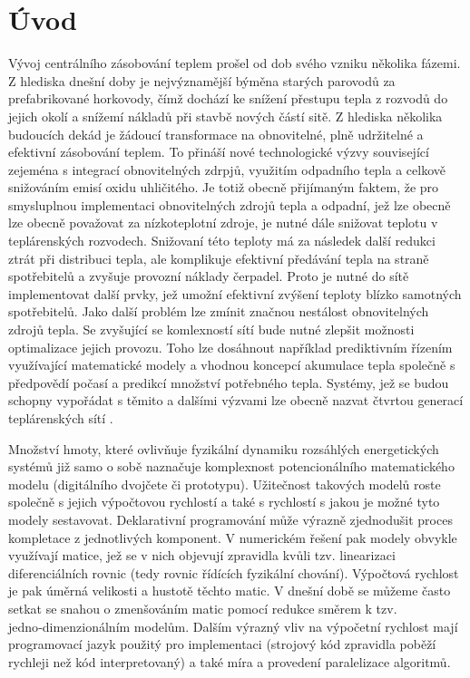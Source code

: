 \chapter{Úvod}
Vývoj centrálního zásobování teplem prošel od dob svého vzniku několika fázemi.
Z hlediska dnešní doby je nejvýznamější býměna starých parovodů za
prefabrikované horkovody, čímž dochází ke snížení přestupu tepla z rozvodů do
jejich okolí a snížemí nákladů při stavbě nových částí sitě. Z hlediska
několika budoucích dekád je žádoucí transformace na obnovitelné, plně
udržitelné a efektivní zásobování teplem. To přináší nové technologické výzvy
související zejeména s integrací obnovitelných zdrpjů, využitím odpadního tepla
a celkově snižováním emisí oxidu uhličitého. Je totiž obecně přijímaným faktem,
že pro smysluplnou implementaci obnovitelných zdrojů tepla a odpadní, jež lze
obecně lze obecně považovat za nízkoteplotní zdroje, je nutné dále snižovat
teplotu v teplárenských rozvodech. Snižovaní této teploty má za následek další
redukci ztrát při distribuci tepla, ale komplikuje efektivní předávání tepla na
straně spotřebitelů a zvyšuje provozní náklady čerpadel. Proto je nutné do sítě
implementovat další prvky, jež umožní efektivní zvýšení teploty blízko
samotných spotřebitelů. Jako další problém lze zmínit značnou nestálost
obnovitelných zdrojů tepla. Se zvyšující se komlexností sítí bude nutné zlepšit
možnosti optimalizace jejich provozu. Toho lze dosáhnout například prediktivním
řízením využívající matematické modely a vhodnou koncepcí akumulace tepla
společně s předpovědí počasí a predikcí množství potřebného tepla. Systémy, jež
se budou schopny vypořádat s těmito a dalšími výzvami lze obecně nazvat čtvrtou
generací teplárenských sítí \cite{Lund2014}.

Množství hmoty, které ovlivňuje fyzikální dynamiku rozsáhlých energetických
systémů již samo o sobě naznačuje komplexnost potencionálního matematického
modelu (digitálního dvojčete či prototypu). Užitečnost takových modelů roste
společně s jejich výpočtovou rychlostí a také s rychlostí s jakou je možné tyto
modely sestavovat. Deklarativní programování může výrazně zjednodušit proces
kompletace z jednotlivých komponent. V numerickém řešení pak modely obvykle
využívají matice, jež se v nich objevují zpravidla kvůli tzv. linearizaci
diferenciálních rovnic (tedy rovnic řídících fyzikální chování). Výpočtová
rychlost je pak úměrná velikosti a hustotě těchto matic. V dnešní době se
můžeme často setkat se snahou o zmenšováním matic pomocí redukce směrem k tzv.
jedno‑dimenzionálním modelům. Dalším výrazný vliv na výpočetní rychlost mají
programovací jazyk použitý pro implementaci (strojový kód zpravidla poběží
rychleji než kód interpretovaný) a také míra a provedení paralelizace
algoritmů.

